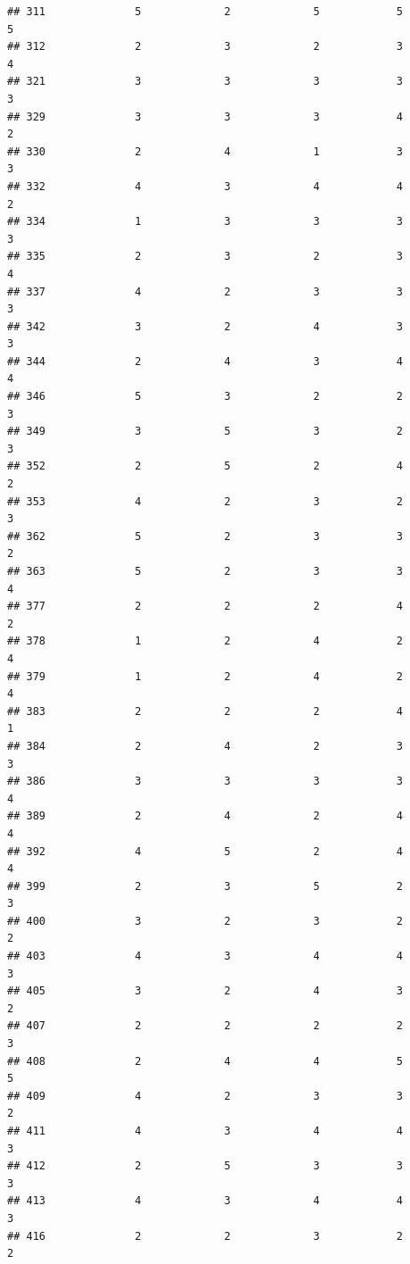 \documentclass[
]{article}
\begin{document}
\begin{verbatim}
## 311              5             2             5            5          5
## 312              2             3             2            3          4
## 321              3             3             3            3          3
## 329              3             3             3            4          2
## 330              2             4             1            3          3
## 332              4             3             4            4          2
## 334              1             3             3            3          3
## 335              2             3             2            3          4
## 337              4             2             3            3          3
## 342              3             2             4            3          3
## 344              2             4             3            4          4
## 346              5             3             2            2          3
## 349              3             5             3            2          3
## 352              2             5             2            4          2
## 353              4             2             3            2          3
## 362              5             2             3            3          2
## 363              5             2             3            3          4
## 377              2             2             2            4          2
## 378              1             2             4            2          4
## 379              1             2             4            2          4
## 383              2             2             2            4          1
## 384              2             4             2            3          3
## 386              3             3             3            3          4
## 389              2             4             2            4          4
## 392              4             5             2            4          4
## 399              2             3             5            2          3
## 400              3             2             3            2          2
## 403              4             3             4            4          3
## 405              3             2             4            3          2
## 407              2             2             2            2          3
## 408              2             4             4            5          5
## 409              4             2             3            3          2
## 411              4             3             4            4          3
## 412              2             5             3            3          3
## 413              4             3             4            4          3
## 416              2             2             3            2          2

\end{verbatim}
\end{document}
